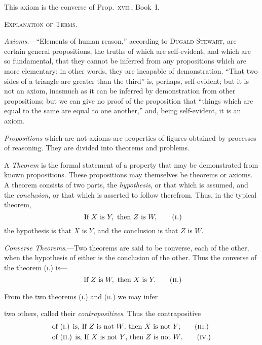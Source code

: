 \documentclass[oneside]{book}
\newcommand\imgcent[2]{
\begin{center}

\end{center}
}
\begin{document}
\imgcent{132}{f011}

This axiom is the converse of Prop.~\textsc{xvii}., Book~I.



\begin{center}
\textsc{Explanation of Terms.}
\end{center}

\emph{Axioms}.---``Elements of human reason,'' according to
\textsc{Dugald Stewart}, are certain general propositions, the
truths of which are self-evident, and which are so fundamental,
that they cannot be inferred from any propositions
which are more elementary; in other words,
they are incapable of demonstration. ``That two sides
of a triangle are greater than the third'' is, perhaps,
self-evident; but it is not an axiom, inasmuch as it can
be inferred by demonstration from other propositions;
but we can give no proof of the proposition that
``things which are equal to the same are equal to one
another,'' and, being self-evident, it is an axiom.

\emph{Propositions} which are not axioms are properties of
figures obtained by processes of reasoning. They are
divided into theorems and problems.

A \emph{Theorem} is the formal statement of a property that
may be demonstrated from known propositions. These
propositions may themselves be theorems or axioms. A
theorem consists of two parts, the \emph{hypothesis}, or that
which is assumed, and the \emph{conclusion}, or that which is
asserted to follow therefrom. Thus, in the typical
theorem,
\[
  \text{\ If } X \text{\ is } Y,\text{\ then }Z \text{\ is } W,
\tag{\textsc{i.}}
\]
the hypothesis is that $X$ is $Y$, and the conclusion is
that $Z$ is $W$.

\emph{Converse Theorems}.---Two theorems are said to be
converse, each of the other, when the hypothesis of
either is the conclusion of the other. Thus the converse
of the theorem (\textsc{i}.) is---
\[
  \text{\ If } Z \text{\ is } W, \text{\ then } X \text{\ is } Y.
\tag{\textsc{ii}.}
\]

From the two theorems (\textsc{i.}) and (\textsc{ii.}) we may infer

two others, called their \emph{contrapositives}. Thus the contrapositive
\begin{align*}
&\text{of (\textsc{i}.) is, If $Z$ is not $W$, then $X$ is not $Y$;} \tag{\textsc{iii}.}
\\
&\text{of (\textsc{ii}.) is, If $X$ is not $Y$, then $Z$ is not $W$.} \tag{\textsc{iv}.}
\end{align*}
\end{document}
